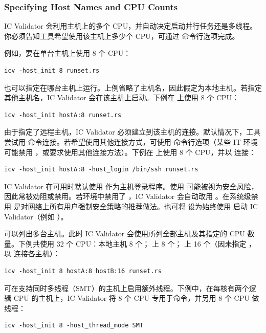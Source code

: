 \subsubsection*{Specifying Host Names and CPU Counts}

IC Validator 会利用主机上的多个 CPU，并自动决定启动并行任务还是多线程。你必须告知工具希望使用该主机上多少个 CPU，可通过  命令行选项完成。

例如，要在单台主机上使用 8 个 CPU：
\begin{lstlisting}
icv -host_init 8 runset.rs
\end{lstlisting}

也可以指定在哪台主机上运行。上例省略了主机名，因此假定为本地主机。若指定其他主机名，IC Validator 会在该主机上启动。下例在  上使用 8 个 CPU：
\begin{lstlisting}
icv -host_init hostA:8 runset.rs
\end{lstlisting}

由于指定了远程主机，IC Validator 必须建立到该主机的连接。默认情况下，工具尝试用  命令连接。若希望使用其他连接方式，可使用  命令行选项（某些 IT 环境可能禁用 ，或要求使用其他连接方法）。下例在  上使用 8 个 CPU，并以  连接：
\begin{lstlisting}
icv -host_init hostA:8 -host_login /bin/ssh runset.rs
\end{lstlisting}

\begin{noteBox}
IC Validator 在可用时默认使用  作为主机登录程序。使用  可能被视为安全风险，因此常被劝阻或禁用。若环境中禁用了 ，IC Validator 会自动改用 。在系统级禁用  是对网络上所有用户强制安全策略的推荐做法。也可将  设为始终使用  启动 IC Validator（例如 ）。
\end{noteBox}

可以列出多台主机。此时 IC Validator 会使用所列全部主机及其指定的 CPU 数量。下例共使用 32 个 CPU：本地主机 8 个； 上 8 个； 上 16 个（因未指定 ，以  连接各主机）：
\begin{lstlisting}
icv -host_init 8 hostA:8 hostB:16 runset.rs
\end{lstlisting}

可在支持同时多线程（SMT）的主机上启用额外线程。下例中，在每核有两个逻辑 CPU 的主机上，IC Validator 将 8 个 CPU 专用于命令，并另用 8 个 CPU 做线程：
\begin{lstlisting}
icv -host_init 8 -host_thread_mode SMT
\end{lstlisting}

